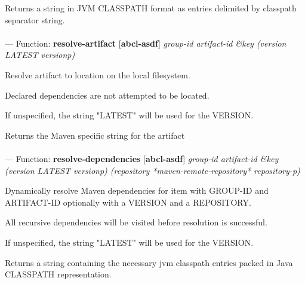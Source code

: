 \begin{adjustwidth}{5em}{5em}
Returns a string in JVM CLASSPATH format as entries delimited by classpath separator string.
\end{adjustwidth}

\paragraph{}
\label{ABCL-ASDF:RESOLVE-ARTIFACT}
--- Function: \textbf{resolve-artifact} [\textbf{abcl-asdf}] \textit{group-id artifact-id \&key (version LATEST versionp)}

\begin{adjustwidth}{5em}{5em}
Resolve artifact to location on the local filesystem.

Declared dependencies are not attempted to be located.

If unspecified, the string "LATEST" will be used for the VERSION.

Returns the Maven specific string for the artifact 
\end{adjustwidth}

\paragraph{}
\label{ABCL-ASDF:RESOLVE-DEPENDENCIES}
--- Function: \textbf{resolve-dependencies} [\textbf{abcl-asdf}] \textit{group-id artifact-id \&key (version LATEST versionp) (repository *maven-remote-repository* repository-p)}

\begin{adjustwidth}{5em}{5em}
Dynamically resolve Maven dependencies for item with GROUP-ID and ARTIFACT-ID 
optionally with a VERSION and a REPOSITORY.  

All recursive dependencies will be visited before resolution is successful.

If unspecified, the string "LATEST" will be used for the VERSION.

Returns a string containing the necessary jvm classpath entries packed
in Java CLASSPATH representation.
\end{adjustwidth}


